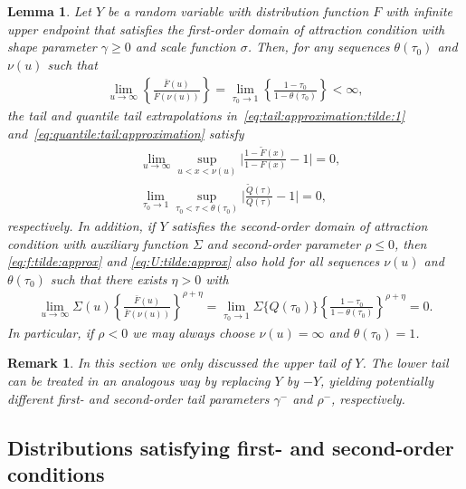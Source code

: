 \documentclass{statsoc}
\newtheorem{lemma}{Lemma}
\newtheorem{remark}{Remark}
\theoremstyle{break}
\newcommand{\tauzero}{\tau_0}
\begin{document}
\begin{lemma}\label{lem:uniform:tail:approximation}
	Let $Y$ be a random variable with distribution function $F$ with infinite upper endpoint that satisfies the first-order domain of attraction condition with shape parameter $\gamma \geq 0$ and scale function $\sigma$.
	Then, for any sequences $\theta(\tau_0) $ and $\nu(u) $ such that
		\begin{align}\label{eq:extra:condition}
			\lim_{u \to \infty} \left\{ \frac{\bar F(u)}{\bar F(\nu(u))} \right\} = \lim_{\tau_0 \to 1}  \left\{ \frac{1-\tau_0}{1-\theta(\tau_0)} \right\} < \infty,
		\end{align}
		the tail and quantile tail extrapolations in~\eqref{eq:tail:approximation:tilde:1} and~\eqref{eq:quantile:tail:approximation} satisfy
	\begin{align} \label{eq:f:tilde:approx} 
		&\lim_{u \to \infty} 
		\sup_{ { u <   x < \nu(u) } }
		\Big| \frac{1-\tilde F(x)}{1-F(x)} - 1 \Big| = 0, \\
 		& \lim_{\tauzero  \to 1} 
		\sup_{ \tauzero < \tau < \theta(\tau_0)}   \Big|\frac{ \tilde Q(\tau)}{  Q(\tau) }  - 1\Big| = 0,    \label{eq:U:tilde:approx}
		\end{align}
		respectively.
	In addition, if $Y$ satisfies the second-order domain of attraction condition with auxiliary function $\Sigma$ and second-order parameter $\rho \leq  0$, 
	then \eqref{eq:f:tilde:approx} and \eqref{eq:U:tilde:approx} also hold for all sequences $\nu(u)$ and $\theta(\tau_0)$ such that 
	 there exists $\eta > 0$ with 
	\begin{align}\label{eq:extra:condition:rho1}
		\lim_{u \to \infty} \Sigma(u)\left\{ \frac{\bar F(u)}{\bar F(\nu(u))} \right\}^{\rho + \eta} = \lim_{\tau_0 \to 1} \Sigma\{Q(\tau_0)\} \left\{ \frac{1-\tau_0}{1-\theta(\tau_0)} \right\}^{\rho + \eta} = 0.
	\end{align}
	In particular, if $\rho<0$ we may always choose $\nu(u) =\infty$ and $\theta(\tauzero) = 1$.
\end{lemma}

\begin{remark}\label{rem:lower_tail}
	In this section we only discussed the upper tail of $Y$. The lower tail can be treated in an analogous way by replacing $Y$ by $-Y$, yielding potentially different first- and second-order tail parameters $\gamma^-$ and $\rho^-$, respectively.
\end{remark}


\subsection{Distributions satisfying first- and second-order conditions}\label{subsec:examples:tails}
\end{document}
